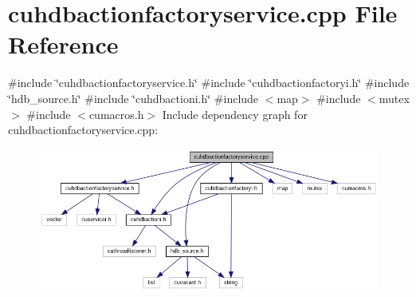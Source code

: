 \section{cuhdbactionfactoryservice.\+cpp File Reference}
\label{cuhdbactionfactoryservice_8cpp}
{\ttfamily \#include \char`\"{}cuhdbactionfactoryservice.\+h\char`\"{}}\newline
{\ttfamily \#include \char`\"{}cuhdbactionfactoryi.\+h\char`\"{}}\newline
{\ttfamily \#include \char`\"{}hdb\+\_\+source.\+h\char`\"{}}\newline
{\ttfamily \#include \char`\"{}cuhdbactioni.\+h\char`\"{}}\newline
{\ttfamily \#include $<$map$>$}\newline
{\ttfamily \#include $<$mutex$>$}\newline
{\ttfamily \#include $<$cumacros.\+h$>$}\newline
Include dependency graph for cuhdbactionfactoryservice.\+cpp\+:
\nopagebreak
\begin{figure}[H]
\begin{center}
\leavevmode
\includegraphics[width=350pt]{cuhdbactionfactoryservice_8cpp__incl}
\end{center}
\end{figure}
